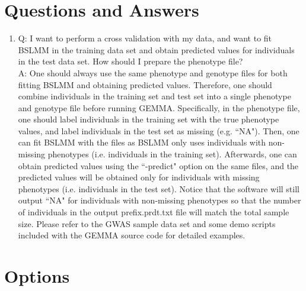 \documentclass[11pt]{article}
\begin{document}
\clearpage
\newpage
\section{Questions and Answers}
\begin{enumerate}
\item Q: I want to perform a cross validation with my data, and want to fit BSLMM in the training data set and obtain predicted values for individuals in the test data set. How should I prepare the phenotype file?\\
A: One should always use the same phenotype and genotype files for both fitting BSLMM and obtaining predicted values. Therefore, one should combine individuals in the training set and test set into a single phenotype and genotype file before running GEMMA. Specifically, in the phenotype file, one should label individuals in the training set with the true phenotype values, and label individuals in the test set as missing (e.g. ``NA"). Then, one can fit BSLMM with the files as BSLMM only uses individuals with non-missing phenotypes (i.e. individuals in the training set). Afterwards, one can obtain predicted values using the ``-predict" option on the same files, and the predicted values will be obtained only for individuals with missing phenotypes (i.e. individuals in the test set). Notice that the software will still output ``NA" for individuals with non-missing phenotypes so that the number of individuals in the output prefix.prdt.txt file will match the total sample size. Please refer to the GWAS sample data set and some demo scripts included with the GEMMA source code for detailed examples.
\end{enumerate}

\clearpage
\newpage
\section{Options}
\end{document}
